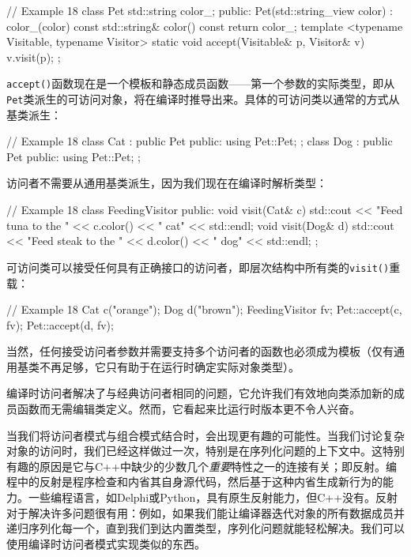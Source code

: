 \begin{code}
{\begin{code}
// Example 18
class Pet {
  std::string color_;
  public:
  Pet(std::string_view color) : color_(color) {}
  const std::string& color() const { return color_; }
  template <typename Visitable, typename Visitor>
  static void accept(Visitable& p, Visitor& v) {
    v.visit(p);
  }
};
\end{code}

\texttt{accept()}函数现在是一个模板和静态成员函数——第一个参数的实际类型，即从\texttt{Pet}类派生的可访问对象，将在编译时推导出来。具体的可访问类以通常的方式从基类派生：

\begin{code}
// Example 18
class Cat : public Pet {
  public:
  using Pet::Pet;
};
class Dog : public Pet {
  public:
  using Pet::Pet;
};
\end{code}

访问者不需要从通用基类派生，因为我们现在在编译时解析类型：

\begin{code}
// Example 18
class FeedingVisitor {
  public:
  void visit(Cat& c) {
    std::cout << "Feed tuna to the " << c.color()
              << " cat" << std::endl;
  }
  void visit(Dog& d) {
    std::cout << "Feed steak to the " << d.color()
              << " dog" << std::endl;
  }
};
\end{code}

可访问类可以接受任何具有正确接口的访问者，即层次结构中所有类的\texttt{visit()}重载：

\begin{code}
// Example 18
Cat c("orange");
Dog d("brown");
FeedingVisitor fv;
Pet::accept(c, fv);
Pet::accept(d, fv);
\end{code}

当然，任何接受访问者参数并需要支持多个访问者的函数也必须成为模板（仅有通用基类不再足够，它只有助于在运行时确定实际对象类型）。

编译时访问者解决了与经典访问者相同的问题，它允许我们有效地向类添加新的成员函数而无需编辑类定义。然而，它看起来比运行时版本更不令人兴奋。

当我们将访问者模式与组合模式结合时，会出现更有趣的可能性。当我们讨论复杂对象的访问时，我们已经这样做过一次，特别是在序列化问题的上下文中。这特别有趣的原因是它与C++中缺少的少数几个\emph{重要}特性之一的连接有关；即反射。编程中的反射是程序检查和内省其自身源代码，然后基于这种内省生成新行为的能力。一些编程语言，如Delphi或Python，具有原生反射能力，但C++没有。反射对于解决许多问题很有用：例如，如果我们能让编译器迭代对象的所有数据成员并递归序列化每一个，直到我们到达内置类型，序列化问题就能轻松解决。我们可以使用编译时访问者模式实现类似的东西。

}
\end{code}
